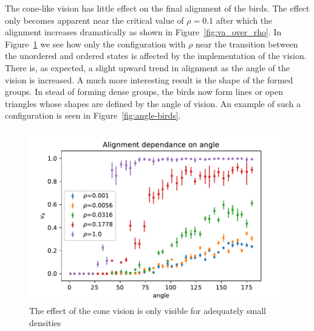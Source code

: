 \documentclass[twoside,twocolumn]{article}
\begin{document}
The cone-like vision has little effect on the final alignment of the birds.
The effect only becomes apparent near the critical value of $\rho=0.1$ after which
the alignment increases dramatically as shown in Figure~\ref{fig:va_over_rho}.
In Figure~\ref{fig:conevision} we see how only the configuration with $\rho$ near the
transition between the unordered and ordered states is affected by the implementation of the vision.
There is, as expected, a slight upward trend in alignment as the angle of the vision is increased.
A much more interesting result is the shape of the formed groups. In stead of forming
dense groups, the birds now form lines or open triangles whose shapes are defined
by the angle of vision. An example of such a configuration is seen in Figure~\ref{fig:angle-birds}.


\begin{figure}[!htb]
\begin{center}
\includegraphics[width=\columnwidth]{va_over_angle}
\end{center}
\caption{The effect of the cone vision is only visible for adequately small densities}\label{fig:conevision}
\end{figure}
\end{document}
